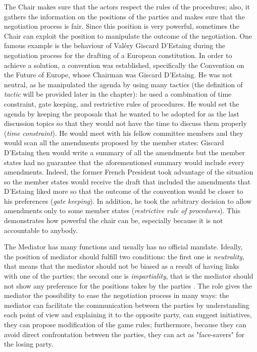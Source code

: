 \documentclass[../main.tex]{subfiles}
\begin{document}
The Chair makes sure that the actors respect the rules of the procedures; also, it gathers the information on the positions of the parties and makes sure that the negotiation process is fair. Since this position is very powerful, sometimes the Chair can exploit the position to manipulate the outcome of the negotiation. One famous example is the behaviour of Valéry Giscard D'Estaing during the negotiation process for the drafting of a European constitution. In order to achieve a solution, a convention was established, specifically the Convention on the Future of Europe, whose Chairman was Giscard D'Estaing. He was not neutral, as he manipulated the agenda by using many tactics (the definition of \textit{tactic} will be provided later in the chapter): he used a combination of time constraint, gate keeping, and restrictive rules of procedures. He would set the agenda by keeping the proposals that he wanted to be adopted for as the last discussion topics so that they would not have the time to discuss them properly (\textit{time constraint}). He would meet with his fellow committee members and they would scan all the amendments proposed by the member states: Giscard D'Estaing then would write a summary of all the amendments but the member states had no guarantee that the aforementioned summary would include every amendments. Indeed, the former French President took advantage of the situation so the member states would receive the draft that included the amendments that D'Estaing liked more so that the outcome of the convention would be closer to his preferences (\textit{gate keeping}). In addition, he took the arbitrary decision to allow amendments only to some member states (\textit{restrictive rule of procedures}). This demonstrates how powerful the chair can be, especially because it is not accountable to anybody.

The Mediator has many functions and usually has no official mandate. Ideally, the position of mediator should fulfill two conditions: the first one is \textit{neutrality}, that means that the mediator should not be biased as a result of having links with one of the parties; the second one is \textit{impartiality}, that is the mediator should not show any preference for the positions takes by the parties \autocite[6]{ropers1997roles}. The role gives the mediator the possibility to ease the negotiation process in many ways: the mediator can facilitate the communication between the parties by understanding each point of view and explaining it to the opposite party, can suggest initiatives, they can propose modification of the game rules; furthermore, because they can avoid direct confrontation between the parties, they can act as "face-savers" for the losing party.
\end{document}
